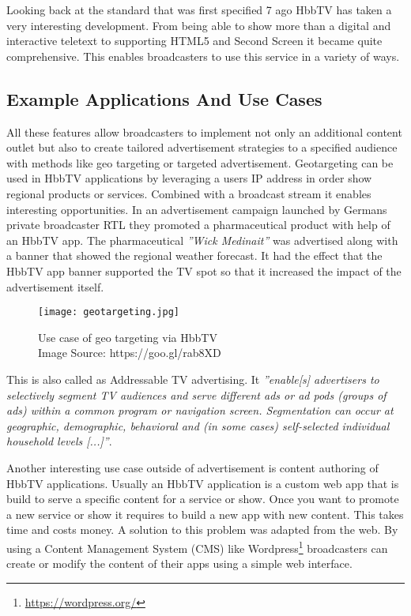 Looking back at the standard that was first specified 7 ago HbbTV has taken a very interesting development. From being able to show more than a digital and interactive teletext to supporting HTML5 and Second Screen it became quite comprehensive. This enables broadcasters to use this service in a variety of ways.

\subsection{Example Applications And Use Cases}

All these features allow broadcasters to implement not only an additional content outlet but also to create tailored advertisement strategies to a specified audience with methods like geo targeting or targeted advertisement. Geotargeting can be used in HbbTV applications by leveraging a users IP address in order show regional products or services. Combined with a broadcast stream it enables interesting opportunities. In an advertisement campaign launched by Germans private broadcaster RTL they promoted a pharmaceutical product with help of an HbbTV app. The pharmaceutical \textit{''Wick Medinait''} was advertised along with a banner that showed the regional weather forecast. It had the effect that the HbbTV app banner supported the TV spot so that it increased the impact of the advertisement itself.

\begin{figure}[htb]
  \centering
  \texttt{[image: geotargeting.jpg]}\\
  \caption{
    Use case of geo targeting via HbbTV\\
    {\tiny Image Source: https://goo.gl/rab8XD}
  }
  \label{fig:geotargeting}
\end{figure}

This is also called as Addressable TV advertising. It \textit{''enable[s] advertisers to selectively segment TV audiences and serve different ads or ad pods (groups of ads) within a common program or navigation screen. Segmentation can occur at geographic, demographic, behavioral and (in some cases) self-selected individual household levels [...]''}\cite{adrTV}.

Another interesting use case outside of advertisement is content authoring of HbbTV applications. Usually an HbbTV application is a custom web app that is build to serve a specific content for a service or show. Once you want to promote a new service or show it requires to build a new app with new content. This takes time and costs money. A solution to this problem was adapted from the web. By using a Content Management System (CMS) like Wordpress\footnote{\url{https://wordpress.org/}} broadcasters can create or modify the content of their apps using a simple web interface.

